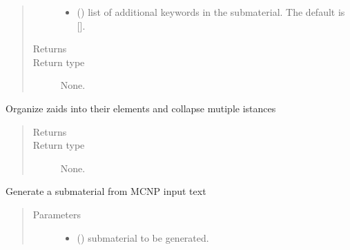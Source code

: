 \documentclass[letterpaper,10pt,english]{sphinxmanual}
\begin{document}
\begin{fulllineitems}
\begin{quote}
\begin{description}
\begin{itemize}
\item {} 
 (\sphinxstyleliteralemphasis{\sphinxupquote{{[}}}\sphinxstyleliteralemphasis{\sphinxupquote{{]}}}\sphinxstyleliteralemphasis{\sphinxupquote{, }}) \textendash{} list of additional keywords in the submaterial. The default is {[}{]}.

\end{itemize}

\item[{Returns}] \leavevmode


\item[{Return type}] \leavevmode
None.

\end{description}\end{quote}

\begin{fulllineitems}
\label{\detokenize{api/inputgeneration:matreader.SubMaterial.collapse_zaids}}
Organize zaids into their elements and collapse mutiple istances
\begin{quote}\begin{description}
\item[{Returns}] \leavevmode


\item[{Return type}] \leavevmode
None.

\end{description}\end{quote}

\end{fulllineitems}


\begin{fulllineitems}
\label{\detokenize{api/inputgeneration:matreader.SubMaterial.from_text}}
Generate a submaterial from MCNP input text
\begin{quote}\begin{description}
\item[{Parameters}] \leavevmode\begin{itemize}
\item {} 
 ({\hyperref[\detokenize{api/inputgeneration:matreader.SubMaterial}]{}}) \textendash{} submaterial to be generated.


\end{itemize}
\end{description}
\end{quote}
\end{fulllineitems}
\end{fulllineitems}
\end{document}
